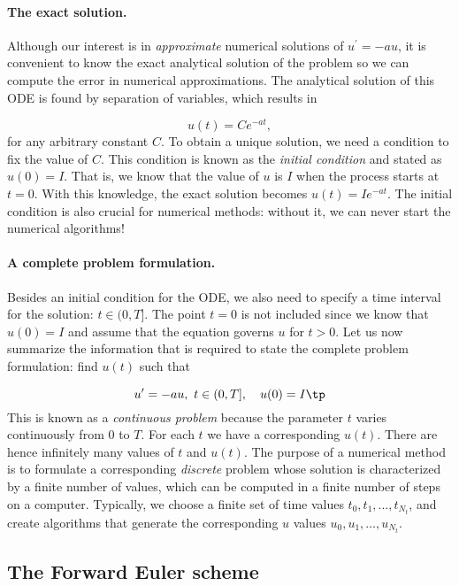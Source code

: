 \documentclass[graybox,sectrefs,envcountresetchap,open=right,final]{svmonodo}
\begin{document}
\paragraph{The exact solution.}
Although our interest is in \emph{approximate} numerical solutions of
$u^{\prime}=-au$, it is convenient to know the exact analytical
solution of the problem so we can compute the error in numerical
approximations.  The analytical solution of this ODE is found by
separation of variables, which results in

\begin{equation*} u(t) = Ce^{-at},\end{equation*}
for any arbitrary constant $C$.
To obtain a unique solution, we need a condition to fix the value of $C$.
This condition is known as the \emph{initial condition} and stated as
$u(0)=I$. That is, we know that the value of $u$ is $I$ when the process
starts at $t=0$. With this knowledge, the exact solution becomes
$u(t)=Ie^{-at}$. The initial condition is also crucial for numerical
methods: without it, we can never start the numerical algorithms!

\paragraph{A complete problem formulation.}
Besides an initial condition for the ODE, we also need to specify a
time interval for the solution: $t\in (0,T]$.
The point $t=0$ is not
included since we know that $u(0)=I$ and assume that the equation governs
$u$ for $t>0$.
Let us now summarize the information that is required to
state the complete problem formulation:
find $u(t)$
such that

\begin{equation}
u^{\prime} = -au,\ t\in (0,T], \quad u(0)=I\tp   \label{decay:problem}
\end{equation}
This is known as a \emph{continuous problem} because the parameter $t$
varies continuously from $0$ to $T$. For each $t$ we have a corresponding
$u(t)$. There are hence infinitely many values of $t$ and $u(t)$.
The purpose of a numerical method is to formulate a corresponding
\emph{discrete} problem whose solution is characterized by a finite number of values,
which can be computed in a finite number of steps on a computer.
Typically, we choose a finite set of time values $t_0,t_1,\ldots,t_{N_t}$,
and create algorithms that generate the corresponding $u$ values
$u_0,u_1,\ldots,u_{N_t}$.


\subsection{The Forward Euler scheme}
\label{decay:schemes:FE}
\end{document}
